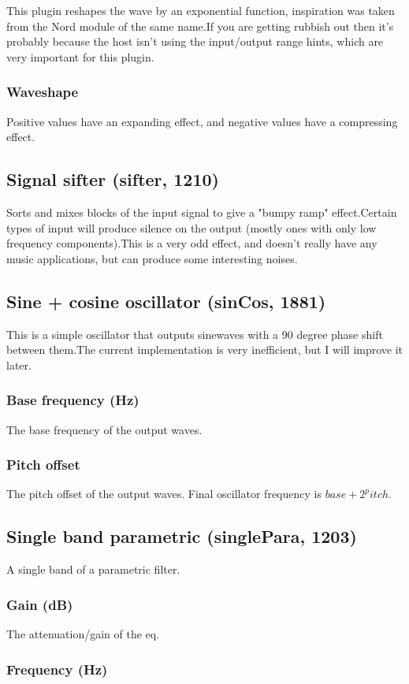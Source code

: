 \documentclass[11pt]{article}
\begin{document}
This plugin reshapes the wave by an exponential function, inspiration was taken from the Nord module of the same name.If you are getting rubbish out then it's probably because the host isn't using the input/output range hints, which are very important for this plugin.\subsubsection*{Waveshape}
Positive values have an expanding effect, and negative values have a compressing effect.\subsection{Signal sifter (sifter, 1210)\label{sifter}\label{id1210}}
Sorts and mixes blocks of the input signal to give a "bumpy ramp" effect.Certain types of input will produce silence on the output (mostly ones with only low frequency components).This is a very odd effect, and doesn't really have any music applications, but can produce some interesting noises.\subsection{Sine + cosine oscillator (sinCos, 1881)\label{sinCos}\label{id1881}}
This is a simple oscillator that outputs sinewaves with a 90 degree phase shift between them.The current implementation is very inefficient, but I will improve it later.\subsubsection*{Base frequency (Hz)}
The base frequency of the output waves.\subsubsection*{Pitch offset}
The pitch offset of the output waves. Final oscillator frequency is $base + 2^pitch$.\subsection{Single band parametric (singlePara, 1203)\label{singlePara}\label{id1203}}
A single band of a parametric filter.\subsubsection*{Gain (dB)}
The attenuation/gain of the eq.\subsubsection*{Frequency (Hz)}
\end{document}
